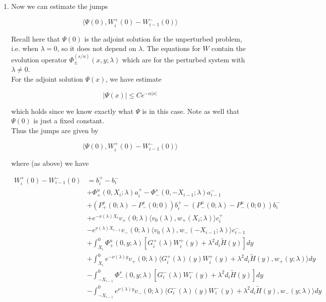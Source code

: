 \documentclass[12pt]{article}
\begin{document}
\begin{enumerate}

\item Now we can estimate the jumps

\[
\langle \Psi(0), W_i^+(0) - W_{i-1}^-(0) \rangle 
\]

Recall here that $\Psi(0)$ is the adjoint solution for the unperturbed problem, i.e. when $\lambda = 0$, so it does not depend on $\lambda$. The equations for $W$ contain the evolution operator $\Phi^{(s/u)}_\pm(x, y; \lambda)$ which are for the perturbed system with $\lambda \neq 0$.\\

For the adjoint solution $\Psi(x)$, we have estimate 

\[
|\Psi(x)| \leq C e^{-\alpha|x|}
\]

which holds since we know exactly what $\Psi$ is in this case. Note as well that $\Psi(0)$ is just a fixed constant.\\

Thus the jumps are given by

\[
\langle \Psi(0), W_i^+(0) - W_{i-1}^-(0) \rangle 
\]

where (as above) we have

\begin{align*}
W_i^+(0) - W_{i-1}^-(0) &= b_i^+ - b_i^- \\
&+ \Phi^u_+(0, X_i; \lambda)a_i^+ - \Phi^s_-(0, -X_{i-1}; \lambda)a_{i-1}^- \\
&+(P^s_+(0; \lambda) - P^s_-(0; 0))b_i^+  - (P^u_-(0; \lambda) - P^u_-(0; 0))b_i^- \\
&+ e^{-\nu(\lambda)X_i} v_+(0; \lambda) \langle v_0(\lambda), w_+(X_i; \lambda) \rangle c_i^+ \\
&- e^{\nu(\lambda)X_{i-1}} v_-(0; \lambda) \langle v_0(\lambda), w_-(-X_{i-1}; \lambda) \rangle c_{i-1}^- \\
&+ \int_{X_i}^0 \Phi^u_+(0, y; \lambda) [ G_i^+(\lambda)W_i^+(y) + \lambda^2 d_i \tilde{H}(y) ] dy \\
&+ \int_{X_i}^0 e^{-\nu(\lambda)y} v_+(0; \lambda) \langle G_i^+(\lambda)(y)W_i^+(y) + \lambda^2 d_i \tilde{H}(y), w_+(y; \lambda) \rangle dy \\
&- \int_{-X_{i-1}}^0 \Phi^s_-(0, y; \lambda) [ G_i^-(\lambda)W_i^-(y) + \lambda^2 d_i \tilde{H}(y) ] dy \\
&- \int_{-X_{i-1}}^0
e^{\nu(\lambda)y} v_-(0; \lambda) \langle G_i^-(\lambda)(y)W_i^-(y) + \lambda^2 d_i \tilde{H}(y), w_-(y; \lambda) \rangle dy \\
\end{align*}


\end{enumerate}
\end{document}
